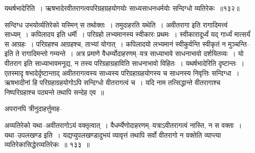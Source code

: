 \documentclass[article,12pt,a4paper]{memoir}
\begin{document}
	  \bigskip
	  \begingroup
	

	  \pstart यथर्षभादेरिति । ऋषभादेरवीतरागत्वपरिग्रहग्रहयोगयोः साध्यसाधनधर्मयोः सन्दिग्धो व्यतिरेकः ॥१३२॥
	\pend
      
	  \endgroup
	 

	  \pstart सन्दिग्ध उभयोर्व्यतिरेको यस्मिन् स तथोक्तः । तमुदाहरति यथेति । अवीतरागा इति रागादिमत्त्वं साध्यम् । कपिलादय इति धर्मी । परिग्रहो लभ्यमानस्य स्वीकारः प्रथमः । स्वीकारादूर्ध्वं यद् गार्ध्यं मात्सर्यं स आग्रहः । परिग्रहश्च आग्रहश्च, ताभ्यां योगात् । कपिलादयो लभ्यमानं स्वीकुर्वन्ति स्वीकृतं न मुञ्चन्ति--इति ते रागादिमन्तो गम्यन्ते । अत्र प्रमाणे वैधर्म्योदाहरणम्--यत्र साध्याभावे साधनाभावो दर्शयितव्यः । यो वीतराग इति साध्याभावमनूद्य, न तस्य परिग्रहाग्रहाविति साधनाभावो विहितः । यथर्षभादेरिति दृष्टान्तः । एतस्मादृ षभादेर्दृष्टान्ताद् अवीतरागत्वस्य साध्यस्य परिग्रहाग्रहयोगस्य च साधनस्य निवृत्तिः सन्दिग्धा । ऋषभादीनां हि परिग्रहाग्रहयोगोऽपि सन्दिग्धो वीतरागत्वं च । यदि नाम तत्सिद्धान्ते वीतरागाश्च निष्परिग्रहाश्च पठ्यन्ते तथापि सन्देह एव ॥
	\pend
        

	  \pstart अपरानपि त्रीनुदाहर्त्तुमाह--
	\pend
        
	  \bigskip
	  \begingroup
	

	  \pstart अव्यतिरेको यथा--अवीतरागोऽयं वक्तृत्वात् । वैधर्म्येणोदाहरणम्--यत्राऽवीतरागत्वं नास्ति, न स वक्ता । यथा--उपलखण्ड इति । यद्यप्युपलखण्डादुभयं व्यावृत्तं तथापि सर्वो वीतरागो न वक्तेति व्याप्त्या व्यतिरेकासिद्धेरव्यतिरेकः ॥ १३३ ॥
	\pend
      
\end{document}
